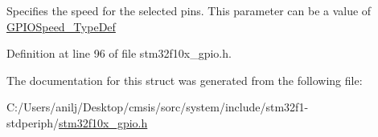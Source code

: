 Specifies the speed for the selected pins. This parameter can be a value of \hyperlink{group___g_p_i_o___exported___types_ga062ad92b67b4a1f301c161022cf3ba8e}{G\+P\+I\+O\+Speed\+\_\+\+Type\+Def} 

Definition at line 96 of file stm32f10x\+\_\+gpio.\+h.



The documentation for this struct was generated from the following file\+:\begin{DoxyCompactItemize}
\item 
C\+:/\+Users/anilj/\+Desktop/cmsis/sorc/system/include/stm32f1-\/stdperiph/\hyperlink{stm32f10x__gpio_8h}{stm32f10x\+\_\+gpio.\+h}\end{DoxyCompactItemize}
